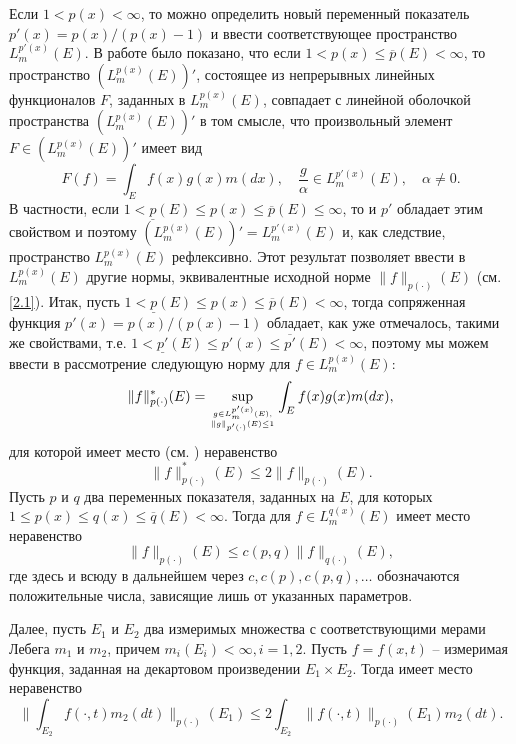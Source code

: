 Если $1<p(x)<\infty$, то можно определить новый переменный показатель $p'(x)=p(x)/(p(x)-1)$ и ввести соответствующее пространство $L^{p'(x)}_m(E)$. В работе \cite{ShIIBJWShar4} было показано, что если $1< p(x)\le \overline{p}(E)<\infty$, то пространство $(L^{p(x)}_m(E))'$, состоящее из непрерывных линейных функционалов $F$, заданных в $L^{p(x)}_m(E)$,  совпадает с линейной оболочкой пространства $(L^{p(x)}_m(E))'$ в том смысле, что произвольный элемент $F\in(L^{p(x)}_m(E))'$ имеет вид
\begin{equation}\label{2.2}
F(f)=\int_E f(x)g(x)m(dx), \quad\frac{g}{\alpha}\in L^{p'(x)}_m(E), \quad\alpha\ne0.
\end{equation}
В частности, если $1<\underline{p}(E)\le p(x)\le \overline{p}(E)\le\infty$, то и $p'$ обладает этим свойством и поэтому $(L^{p(x)}_m(E))'=L^{p'(x)}_m(E)$ и, как следствие, пространство $L^{p(x)}_m(E)$ рефлексивно. Этот результат позволяет ввести в $L^{p(x)}_m(E)$
другие нормы, эквивалентные исходной норме $\|f\|_{p(\cdot)}(E)$ (см.\eqref{2.1}). Итак, пусть $1<\underline{p}(E)\le p(x)\le \overline{p}(E)<\infty$, тогда сопряженная функция $p'(x)=p(x)/(p(x)-1)$  обладает, как уже отмечалось, такими же свойствами, т.е. $1<\underline{p'}(E)\le p'(x)\le \overline{p'}(E)<\infty$, поэтому мы можем ввести в рассмотрение следующую норму для $f\in L^{p(x)}_m(E)$:
\begin{equation}\label{2.3}
\|f\|^*_{p(\cdot)}(E)=\sup_{g\in L^{p'(x)}_{m}(E), \atop\|g\|_{p'(\cdot)}(E)\le1}\int_Ef(x)g(x)m(dx),
\end{equation}
для которой имеет место (см. \cite{ShIIBJWShar3}) неравенство
\begin{equation}\label{2.4}
\|f\|^*_{p(\cdot)}(E)\le 2\|f\|_{p(\cdot)}(E).
\end{equation}
Пусть $p$ и $q$ два переменных показателя, заданных на $E$, для которых $1\le p(x)\le q(x)\le \overline{q}(E)<\infty$. Тогда для $f\in L^{q(x)}_m(E)$  имеет место \cite{ShIIBJWShar2,ShIIBJWShar3,ShIIBJWShar6} неравенство
\begin{equation}\label{2.5}
\|f\|_{p(\cdot)}(E)\le c(p,q)\|f\|_{q(\cdot)}(E),
\end{equation}
где здесь и всюду  в дальнейшем через $c, c(p), c(p,q),\ldots $ обозначаются положительные
числа, зависящие лишь от указанных параметров.

Далее, пусть $E_1$  и $E_2$ два измеримых множества с соответствующими мерами Лебега $m_1$ и $m_2$, причем $m_i(E_i)<\infty, i=1,2$. Пусть $f=f(x,t)$ -- измеримая функция, заданная на декартовом произведении $E_1\times E_2$. Тогда имеет место  \cite{ShIIBJWShar2,ShIIBJWShar3,ShIIBJWShar6} неравенство
\begin{equation}\label{2.6}
\|\int_{E_2}f(\cdot,t)m_2(dt)\|_{p(\cdot)}(E_1)\le 2\int_{E_2}\|f(\cdot,t)\|_{p(\cdot)}(E_1)m_2(dt).
\end{equation}




